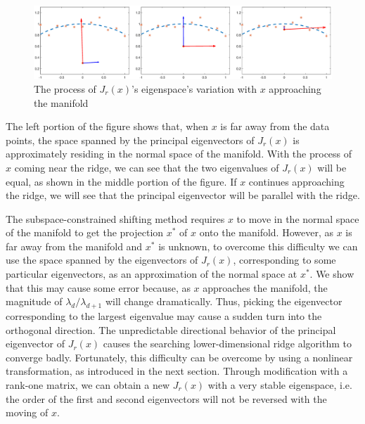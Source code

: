 \documentclass[aos,preprint]{imsart}
\theoremstyle{remark}
\begin{document}
\begin{figure}[h] %
\includegraphics[width=\linewidth]{demo123.eps} 
\caption{The process of $J_r(x)$'s eigenspace's variation with $x$ approaching the manifold }
\label{Shifting Eigenvectors}
\end{figure}

The left portion of the figure shows that, when $x$ is far away from the data points, the space spanned by the principal eigenvectors of $J_r(x)$ is approximately residing in the normal space of the manifold. With the process of $x$ coming near the ridge, we can see that the two eigenvalues of $J_r(x)$ will be equal, as shown in the middle portion of the figure. If $x$ continues approaching the ridge, we will see that the principal eigenvector will be parallel with the ridge.

The subspace-constrained shifting method requires $x$ to move in the normal space of the manifold to get the projection $x^*$ of $x$ onto the manifold. However, as $x$ is far away from the manifold and $x^*$ is unknown, to overcome this difficulty we can use the space spanned by the eigenvectors of $J_r(x)$, corresponding to some particular eigenvectors, as an approximation of the normal space at $x^*$. We show that this may cause some error because, as $x$ approaches the manifold, the magnitude of $\lambda_d/\lambda_{d+1}$ will change dramatically. Thus, picking the eigenvector corresponding to the largest eigenvalue may cause a sudden turn into the orthogonal direction. The unpredictable directional behavior of the principal eigenvector of $J_r(x)$ causes the searching lower-dimensional ridge algorithm to converge badly. Fortunately, this difficulty can be overcome by using a nonlinear transformation, as introduced in the next section. Through modification with a rank-one matrix, we can obtain a new $J_r(x)$ with a very stable eigenspace, i.e. the order of the first and second eigenvectors will not be reversed with the moving of $x$. %
\end{document}
